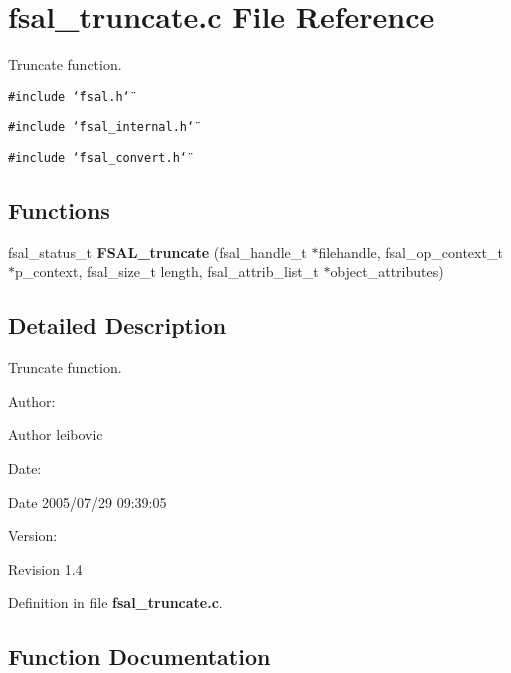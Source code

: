 \section{fsal\_\-truncate.c File Reference}
\label{fsal__truncate_8c}
Truncate function. 

{\tt \#include \char`\"{}fsal.h\char`\"{}}\par
{\tt \#include \char`\"{}fsal\_\-internal.h\char`\"{}}\par
{\tt \#include \char`\"{}fsal\_\-convert.h\char`\"{}}\par
\subsection*{Functions}
\begin{CompactItemize}
\item 
fsal\_\-status\_\-t {\bf FSAL\_\-truncate} (fsal\_\-handle\_\-t $\ast$filehandle, fsal\_\-op\_\-context\_\-t $\ast$p\_\-context, fsal\_\-size\_\-t length, fsal\_\-attrib\_\-list\_\-t $\ast$object\_\-attributes)
\end{CompactItemize}


\subsection{Detailed Description}
Truncate function. 

\begin{Desc}
\item[Author:]\begin{Desc}
\item[Author]leibovic \end{Desc}
\end{Desc}
\begin{Desc}
\item[Date:]\begin{Desc}
\item[Date]2005/07/29 09:39:05 \end{Desc}
\end{Desc}
\begin{Desc}
\item[Version:]\begin{Desc}
\item[Revision]1.4 \end{Desc}
\end{Desc}


Definition in file {\bf fsal\_\-truncate.c}.

\subsection{Function Documentation}
